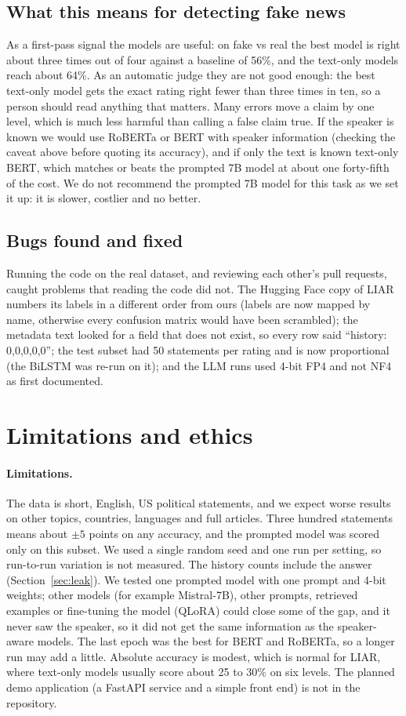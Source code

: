 \documentclass{nle}
\begin{document}
\subsection{What this means for detecting fake news} As a first-pass signal the models are useful: on fake vs real
the best model is right about three times out of four against a baseline of 56\%, and the text-only models reach about
64\%. As an automatic judge they are not good enough: the best text-only model gets the exact rating right fewer than
three times in ten, so a person should read anything that matters. Many errors move a claim by one level, which is much
less harmful than calling a false claim true. If the speaker is known we would use RoBERTa or BERT with speaker
information (checking the caveat above before quoting its accuracy), and if only the text is known text-only BERT,
which matches or beats the prompted 7B model at about one forty-fifth of the cost. We do not recommend the prompted
7B model for this task as we set it up: it is slower, costlier and no better.

\subsection{Bugs found and fixed}\label{sec:bugs} Running the code on the real dataset, and reviewing each other's pull requests,
caught problems that reading the code did not. The Hugging Face copy of LIAR numbers its labels in a different order
from ours (labels are now mapped by name, otherwise every confusion matrix would have been scrambled); the metadata
text looked for a field that does not exist, so every row said ``history: 0,0,0,0,0''; the test subset had 50
statements per rating and is now proportional (the BiLSTM was re-run on it); and the LLM runs used 4-bit FP4 and not
NF4 as first documented.

\section{Limitations and ethics}

\paragraph{Limitations.} The data is short, English, US political statements, and we expect worse results on other
topics, countries, languages and full articles. Three hundred statements means about $\pm 5$ points on any accuracy,
and the prompted model was scored only on this subset. We used a single random seed and one run per setting, so
run-to-run variation is not measured. The history counts include the answer (Section~\ref{sec:leak}). We tested one
prompted model with one prompt and 4-bit weights; other models (for example Mistral-7B), other prompts, retrieved
examples or fine-tuning the model (QLoRA) could close some of the gap, and it never saw the speaker, so it did not get
the same information as the speaker-aware models. The last epoch was the best for BERT and RoBERTa, so a longer run may
add a little. Absolute accuracy is modest, which is normal for LIAR, where text-only models usually score about 25 to
30\% on six levels. The planned demo application (a FastAPI service and a simple front end) is not in the repository.
\end{document}
